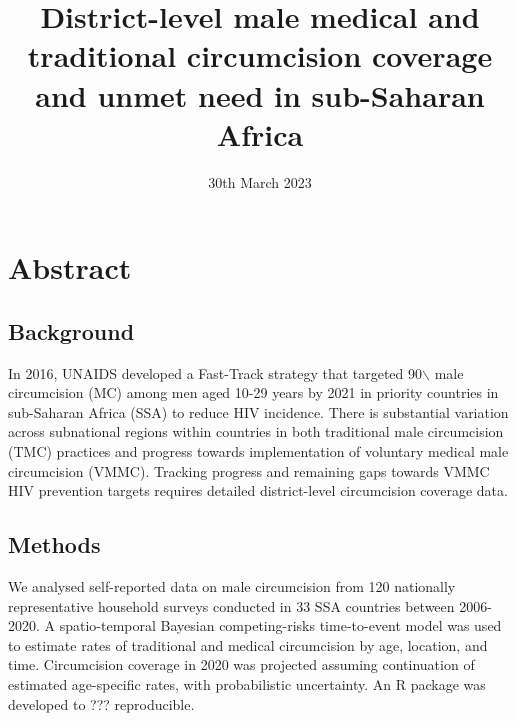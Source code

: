 \documentclass{article}
\date{30th March 2023}
\title{District-level male medical and traditional circumcision coverage and unmet need in sub-Saharan Africa}
\begin{document}
\maketitle

\section*{Abstract}
\label{sec:org9ed8edd}
\subsection*{Background}
\label{sec:org1fc78ed}
In 2016, UNAIDS developed a Fast-Track strategy that targeted 90$\backslash$%
male circumcision (MC) among men aged 10-29 years by 2021 in priority countries in sub-Saharan 
Africa (SSA) to reduce HIV incidence. There is substantial variation across subnational 
regions within countries in both traditional male circumcision (TMC) practices and progress
towards implementation of voluntary medical male circumcision (VMMC). Tracking progress and
remaining gaps towards VMMC HIV prevention targets requires detailed district-level circumcision
coverage data.

\subsection*{Methods}
\label{sec:org72fee94}
We analysed self-reported data on male circumcision from 120 nationally representative household
surveys conducted in 33 SSA countries between 2006-2020. A spatio-temporal Bayesian
competing-risks time-to-event model was used to estimate rates of traditional and medical
circumcision by age, location, and time. Circumcision coverage in 2020 was projected assuming
continuation of estimated age-specific rates, with probabilistic uncertainty. An R package was
developed to ??? reproducible.
\end{document}
